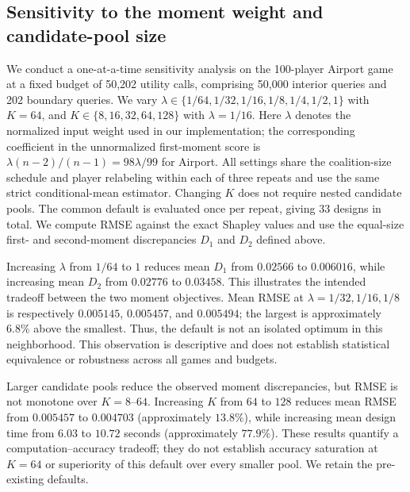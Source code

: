 
\subsection{Sensitivity to the moment weight and candidate-pool size}
\label{app:inside_sensitivity}
We conduct a one-at-a-time sensitivity analysis on the 100-player Airport
game at a fixed budget of 50,202 utility calls, comprising 50,000 interior
queries and 202 boundary queries. We vary
$\lambda\in\{1/64,1/32,1/16,1/8,1/4,1/2,1\}$ with $K=64$, and
$K\in\{8,16,32,64,128\}$ with $\lambda=1/16$.
Here $\lambda$ denotes the normalized input weight used in our implementation;
the corresponding coefficient in the unnormalized first-moment score is
$\lambda(n-2)/(n-1)=98\lambda/99$ for Airport.
All settings share the coalition-size schedule and player relabeling within
each of three repeats and use the same strict conditional-mean estimator.
Changing $K$ does not require nested candidate pools. The common default
is evaluated once per repeat, giving 33 designs in total.
We compute RMSE against the exact Shapley values and use the equal-size
first- and second-moment discrepancies $D_1$ and $D_2$ defined above.

Increasing $\lambda$ from $1/64$ to $1$ reduces mean $D_1$ from $0.02566$
to $0.006016$, while increasing mean $D_2$ from $0.02776$ to $0.03458$.
This illustrates the intended tradeoff between the two moment objectives.
Mean RMSE at $\lambda=1/32,1/16,1/8$ is respectively
$0.005145$, $0.005457$, and $0.005494$; the largest is approximately
$6.8\%$ above the smallest. Thus, the default is not an isolated optimum
in this neighborhood. This observation is descriptive and does not
establish statistical equivalence or robustness across all games and budgets.

Larger candidate pools reduce the observed moment discrepancies, but RMSE
is not monotone over $K=8$--$64$. Increasing $K$ from $64$ to $128$ reduces
mean RMSE from $0.005457$ to $0.004703$ (approximately $13.8\%$), while
increasing mean design time from $6.03$ to $10.72$ seconds
(approximately $77.9\%$). These results quantify a computation--accuracy
tradeoff; they do not establish accuracy saturation at $K=64$ or superiority
of this default over every smaller pool. We retain the pre-existing defaults.

